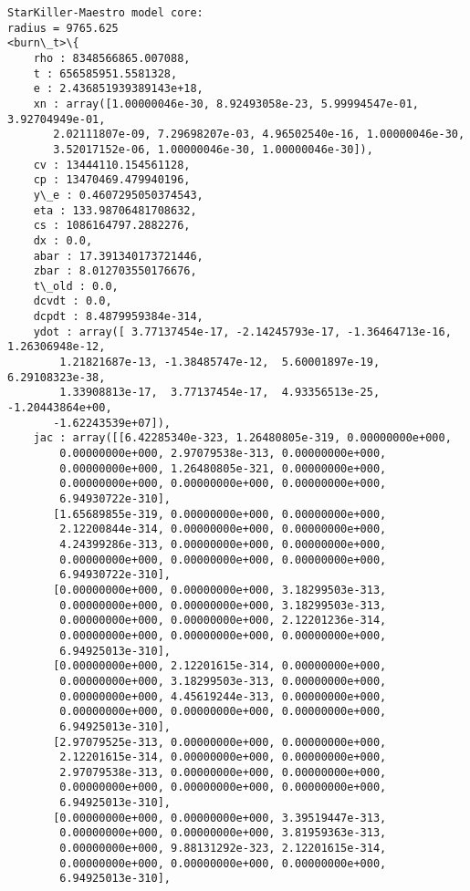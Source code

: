 \documentclass[11pt]{article}
\begin{document}
    \begin{Verbatim}[commandchars=\\\{\}]
StarKiller-Maestro model core:
radius = 9765.625
<burn\_t>\{
    rho : 8348566865.007088,
    t : 656585951.5581328,
    e : 2.436851939389143e+18,
    xn : array([1.00000046e-30, 8.92493058e-23, 5.99994547e-01, 3.92704949e-01,
       2.02111807e-09, 7.29698207e-03, 4.96502540e-16, 1.00000046e-30,
       3.52017152e-06, 1.00000046e-30, 1.00000046e-30]),
    cv : 13444110.154561128,
    cp : 13470469.479940196,
    y\_e : 0.4607295050374543,
    eta : 133.98706481708632,
    cs : 1086164797.2882276,
    dx : 0.0,
    abar : 17.391340173721446,
    zbar : 8.012703550176676,
    t\_old : 0.0,
    dcvdt : 0.0,
    dcpdt : 8.4879959384e-314,
    ydot : array([ 3.77137454e-17, -2.14245793e-17, -1.36464713e-16,  1.26306948e-12,
        1.21821687e-13, -1.38485747e-12,  5.60001897e-19,  6.29108323e-38,
        1.33908813e-17,  3.77137454e-17,  4.93356513e-25, -1.20443864e+00,
       -1.62243539e+07]),
    jac : array([[6.42285340e-323, 1.26480805e-319, 0.00000000e+000,
        0.00000000e+000, 2.97079538e-313, 0.00000000e+000,
        0.00000000e+000, 1.26480805e-321, 0.00000000e+000,
        0.00000000e+000, 0.00000000e+000, 0.00000000e+000,
        6.94930722e-310],
       [1.65689855e-319, 0.00000000e+000, 0.00000000e+000,
        2.12200844e-314, 0.00000000e+000, 0.00000000e+000,
        4.24399286e-313, 0.00000000e+000, 0.00000000e+000,
        0.00000000e+000, 0.00000000e+000, 0.00000000e+000,
        6.94930722e-310],
       [0.00000000e+000, 0.00000000e+000, 3.18299503e-313,
        0.00000000e+000, 0.00000000e+000, 3.18299503e-313,
        0.00000000e+000, 0.00000000e+000, 2.12201236e-314,
        0.00000000e+000, 0.00000000e+000, 0.00000000e+000,
        6.94925013e-310],
       [0.00000000e+000, 2.12201615e-314, 0.00000000e+000,
        0.00000000e+000, 3.18299503e-313, 0.00000000e+000,
        0.00000000e+000, 4.45619244e-313, 0.00000000e+000,
        0.00000000e+000, 0.00000000e+000, 0.00000000e+000,
        6.94925013e-310],
       [2.97079525e-313, 0.00000000e+000, 0.00000000e+000,
        2.12201615e-314, 0.00000000e+000, 0.00000000e+000,
        2.97079538e-313, 0.00000000e+000, 0.00000000e+000,
        0.00000000e+000, 0.00000000e+000, 0.00000000e+000,
        6.94925013e-310],
       [0.00000000e+000, 0.00000000e+000, 3.39519447e-313,
        0.00000000e+000, 0.00000000e+000, 3.81959363e-313,
        0.00000000e+000, 9.88131292e-323, 2.12201615e-314,
        0.00000000e+000, 0.00000000e+000, 0.00000000e+000,
        6.94925013e-310],

\end{Verbatim}
\end{document}
